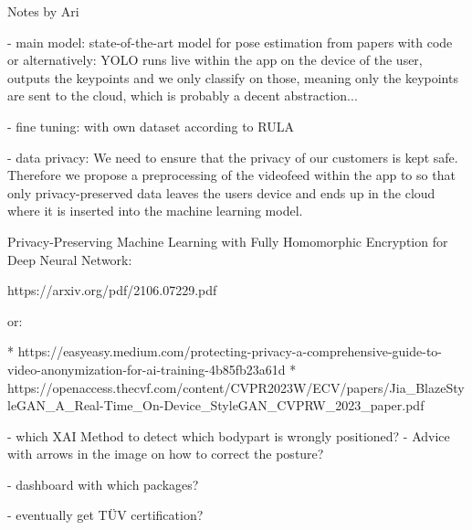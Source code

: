
Notes by Ari

- main model:
state-of-the-art model for pose estimation from papers with code
or alternatively:
YOLO runs live within the app on the device of the user, outputs the keypoints and we only classify on those, meaning only the keypoints are sent to the cloud, which is probably a decent abstraction...

- fine tuning:
with own dataset according to RULA

- data privacy:
We need to ensure that the privacy of our customers is kept safe. Therefore we propose a preprocessing of the videofeed within the app to so that only privacy-preserved data leaves the users device and ends up in the cloud where it is inserted into the machine learning model.

Privacy-Preserving Machine Learning with Fully Homomorphic Encryption for Deep Neural Network:

https://arxiv.org/pdf/2106.07229.pdf

or:

* https://easyeasy.medium.com/protecting-privacy-a-comprehensive-guide-to-video-anonymization-for-ai-training-4b85fb23a61d
* https://openaccess.thecvf.com/content/CVPR2023W/ECV/papers/Jia_BlazeStyleGAN_A_Real-Time_On-Device_StyleGAN_CVPRW_2023_paper.pdf

- which XAI Method to detect which bodypart is wrongly positioned?
- Advice with arrows in the image on how to correct the posture?

- dashboard with which packages?

- eventually get TÜV certification?
